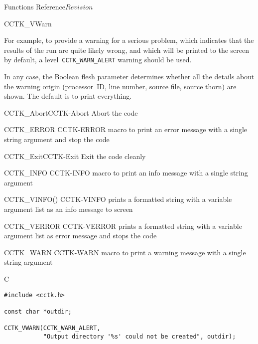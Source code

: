 \begin{cactuspart}{ Functions Reference}{}{$Revision$}
\begin{FunctionDescription}{CCTK\_VWarn}
\begin{Discussion}
For example, to provide a warning for a serious problem, which
indicates that the results of the run are quite likely wrong,
and which will be printed to the screen by default,
a level~\verb|CCTK_WARN_ALERT| warning should be used.

In any case, the Boolean flesh parameter 
determines whether all the details about the warning origin (processor~ID,
line number, source file, source thorn) are shown. The default is to
print everything.
\end{Discussion}

\begin{SeeAlsoSection}
\begin{SeeAlso2}{CCTK\_Abort}{CCTK-Abort}
Abort the code
\end{SeeAlso2}
\begin{SeeAlso2} {CCTK\_ERROR} {CCTK-ERROR}
macro to print an error message with a single string argument and stop
the code
\end{SeeAlso2}
\begin{SeeAlso2}{CCTK\_Exit}{CCTK-Exit}
Exit the code cleanly
\end{SeeAlso2}
\begin{SeeAlso2} {CCTK\_INFO} {CCTK-INFO}
macro to print an info message with a single string argument
\end{SeeAlso2}
\begin{SeeAlso2} {CCTK\_VINFO()} {CCTK-VINFO}
prints a formatted string with a variable argument list as an info message to
screen
\end{SeeAlso2}
\begin{SeeAlso2} {CCTK\_VERROR} {CCTK-VERROR}
prints a formatted string with a variable argument list as error
message and stops the code
\end{SeeAlso2}
\begin{SeeAlso2} {CCTK\_WARN} {CCTK-WARN}
macro to print a warning message with a single string argument
\end{SeeAlso2}
\end{SeeAlsoSection}

\begin{ExampleSection}
\begin{Example}{C}
\begin{verbatim}
#include <cctk.h>

const char *outdir;

CCTK_VWARN(CCTK_WARN_ALERT,
           "Output directory '%s' could not be created", outdir);
\end{verbatim}
\end{Example}
\end{ExampleSection}
\end{FunctionDescription}


\end{cactuspart}
